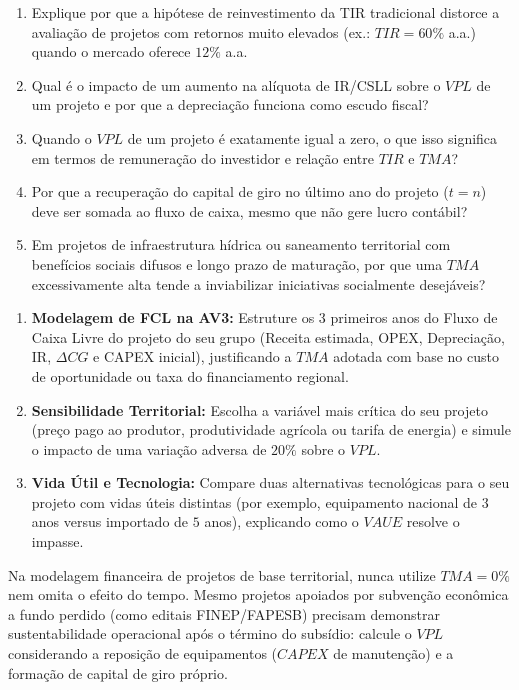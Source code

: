 \begin{enumerate}[leftmargin=1.6em, itemsep=5pt]
  \item Explique por que a hipótese de reinvestimento da TIR tradicional distorce a avaliação de projetos com retornos muito elevados (ex.: $TIR = 60\%$ a.a.) quando o mercado oferece $12\%$ a.a. \espacoResolucao[1.5cm]
  \item Qual é o impacto de um aumento na alíquota de IR/CSLL sobre o $VPL$ de um projeto e por que a depreciação funciona como escudo fiscal? \espacoResolucao[1.5cm]
  \item Quando o $VPL$ de um projeto é exatamente igual a zero, o que isso significa em termos de remuneração do investidor e relação entre $TIR$ e $TMA$? \espacoResolucao[1.5cm]
  \item Por que a recuperação do capital de giro no último ano do projeto ($t=n$) deve ser somada ao fluxo de caixa, mesmo que não gere lucro contábil? \espacoResolucao[1.5cm]
  \item Em projetos de infraestrutura hídrica ou saneamento territorial com benefícios sociais difusos e longo prazo de maturação, por que uma $TMA$ excessivamente alta tende a inviabilizar iniciativas socialmente desejáveis? \espacoResolucao[1.5cm]
\end{enumerate}


\begin{enumerate}[leftmargin=1.6em, itemsep=5pt]
  \item \textbf{Modelagem de FCL na AV3:} Estruture os 3 primeiros anos do Fluxo de Caixa Livre do projeto do seu grupo (Receita estimada, OPEX, Depreciação, IR, $\Delta CG$ e CAPEX inicial), justificando a $TMA$ adotada com base no custo de oportunidade ou taxa do financiamento regional. \espacoResolucao[2.0cm]
  \item \textbf{Sensibilidade Territorial:} Escolha a variável mais crítica do seu projeto (preço pago ao produtor, produtividade agrícola ou tarifa de energia) e simule o impacto de uma variação adversa de $20\%$ sobre o $VPL$. \espacoResolucao[1.8cm]
  \item \textbf{Vida Útil e Tecnologia:} Compare duas alternativas tecnológicas para o seu projeto com vidas úteis distintas (por exemplo, equipamento nacional de $3$ anos versus importado de $5$ anos), explicando como o $VAUE$ resolve o impasse. \espacoResolucao[1.6cm]
\end{enumerate}

\begin{boxDica}
Na modelagem financeira de projetos de base territorial, nunca utilize $TMA = 0\%$ nem omita o efeito do tempo. Mesmo projetos apoiados por subvenção econômica a fundo perdido (como editais FINEP/FAPESB) precisam demonstrar sustentabilidade operacional após o término do subsídio: calcule o $VPL$ considerando a reposição de equipamentos ($CAPEX$ de manutenção) e a formação de capital de giro próprio.
\end{boxDica}

